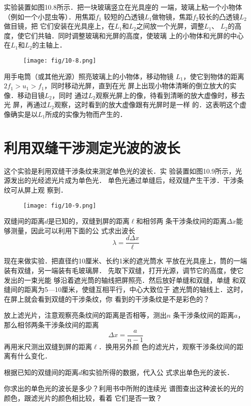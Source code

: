 实验装置如图10.8所示．把一块玻璃竖立在光具座的
一端，玻璃上粘一个小物体（例如一个小昆虫等）．用焦距$f_1$
较短的凸透镜$L_1$做物镜，焦距$f_2$较长的凸透镜$L_2$做目镜，把
它们安装在光具座上，在$L_1$和$L_2$之间放一个光屏，调整$L_1$、
$L_2$的高度，使它们共轴．同时调整玻璃和光屏的高度，使玻璃
上的小物体和光屏的中心在$L_1$和$L_2$的主轴上．
\begin{figure}[htp]\centering
    \texttt{[image: fig/10-8.png]}
    \caption{}
    \end{figure}

用手电筒（或其他光源）照亮玻璃上的小物体，移动物镜
$L_1$，使它到物体的距离$2f_1>u_1>f_1$，同时移动光屏，直到在光
屏上出现小物体清晰的倒立放大的实像．移动目镜$L_2$，同时
通过$L_2$观察光屏上的像，待看到清晰的放大虚像时，移去光
屏，再通过$L_2$观察，这时看到的放大虚像跟有光屏时是一样
的．这表明这个虚像确实是以$L_1$所成的实像为物而产生的．

\section{利用双缝干涉测定光波的波长}

这个实验是利用双缝干涉条纹来测定单色光的波长．实
验装置如图10.9所示，光源发出的光经滤光片成为单色光．
单色光通过单缝后，经双缝产生干涉．干涉条纹可从屏上观
察到．
\begin{figure}[htp]\centering
    \texttt{[image: fig/10-9.png]}
    \caption{}
    \end{figure}

双缝间的距离$d$是已知的，双缝到屏的距离$\ell$和相邻两
条干涉条纹间的距离$\Delta x$能够测量，因此可以利用下面的公
式求出波长
\[\lambda=\frac{d\Delta x}{\ell} \]

现在来做实验．把直径约10厘米、长约1米的遮光筒水
平放在光具座上，筒的一端装有双缝，另一端装有毛玻璃屏．
先取下双缝，打开光源，调节它的高度，使它发出的一束光能
够沿着遮光筒的轴线把屏照亮．然后放好单缝和双缝，单缝
和双缝间的距离为5—10厘米，使缝互相平行，中心大致位于
遮光筒的轴线上．这时，在屏上就会看到双缝的干涉条纹，你
看到的干涉条纹是不是彩色的？

放上滤光片，注意观察亮条纹间的距离是否相等，测出$n$
条干涉条纹间的距离$a$，那么相邻两条干涉条纹间的距离
\[\Delta x=\frac{a}{n-1} \]
再用米尺测出双缝到屏的距离$\ell$．换用另外颜
色的滤光片，观察干涉条纹间的距离有什么变化．

根据已知的双缝间的距离$d$和实验所得的数据，代入公
式求出单色光的波长．

你求出的单色光的波长是多少？利用书中所附的连续光
谱图查出这种波长的光的颜色，跟滤光片的颜色相比较，看着
它们是否一致？

